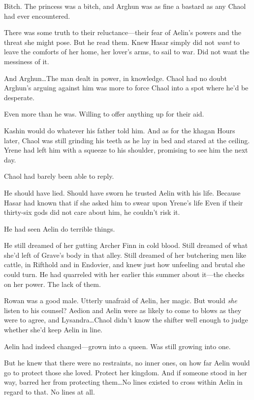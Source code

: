 Bitch.
The princess was a bitch, and Arghun was as fine a bastard as any Chaol had ever encountered.

There was some truth to their reluctance---their fear of Aelin's powers and the threat she might pose.
But he read them.
Knew Hasar simply did not \emph{want} to leave the comforts of her home, her lover's arms, to sail to war.
Did not want the messiness of it.

And Arghun\ldots The man dealt in power, in knowledge.
Chaol had no doubt Arghun's arguing against him was more to force Chaol into a spot where he'd be desperate.

Even more than he was.
Willing to offer anything up for their aid.

Kashin would do whatever his father told him.
And as for the khagan 
Hours later, Chaol was still grinding his teeth as he lay in bed and stared at the ceiling.
Yrene had left him with a squeeze to his shoulder, promising to see him the next day.

Chaol had barely been able to reply.

He should have lied.
Should have sworn he trusted Aelin with his life.
Because Hasar had known that if she asked him to swear upon Yrene's life  Even if their thirty-six gods did not care about him, he couldn't risk it.

He had seen Aelin do terrible things.

He still dreamed of her gutting Archer Finn in cold blood.
Still dreamed of what she'd left of Grave's body in that alley.
Still dreamed of her butchering men like cattle, in Rifthold and in Endovier, and knew just how unfeeling and brutal she could turn.
He had quarreled with her earlier this summer about it---the checks on her power.
The lack of them.

Rowan was a good male.
Utterly unafraid of Aelin, her magic.
But would \emph{she} listen to his counsel?
Aedion and Aelin were as likely to come to blows as they were to agree, and Lysandra\ldots Chaol didn't know the shifter well enough to judge whether she'd keep Aelin in line.

Aelin had indeed changed---grown into a queen.
Was still growing into one.

But he knew that there were no restraints, no inner ones, on how far Aelin would go to protect those she loved.
Protect her kingdom.
And if someone stood in her way, barred her from protecting them\ldots No lines existed to cross within Aelin in regard to that.
No lines at all.

